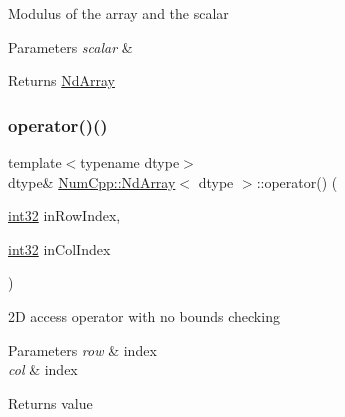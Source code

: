Modulus of the array and the scalar


\begin{DoxyParams}{Parameters}
{\em scalar} & \\
\hline
\end{DoxyParams}
\begin{DoxyReturn}{Returns}
\mbox{\hyperlink{class_num_cpp_1_1_nd_array}{Nd\+Array}} 
\end{DoxyReturn}
\mbox{\label{class_num_cpp_1_1_nd_array_a4986e1b7b9a46180f619523f80fcd288}} 
\subsubsection{\texorpdfstring{operator()()}{operator()()}\hspace{0.1cm}{\footnotesize\ttfamily [1/5]}}
{\footnotesize\ttfamily template$<$typename dtype$>$ \\
dtype\& \mbox{\hyperlink{class_num_cpp_1_1_nd_array}{Num\+Cpp\+::\+Nd\+Array}}$<$ dtype $>$\+::operator() (\begin{DoxyParamCaption}\item[{\mbox{\hyperlink{namespace_num_cpp_acf3eb1592f8b248ff0a236634864633c}{int32}}}]{in\+Row\+Index,  }\item[{\mbox{\hyperlink{namespace_num_cpp_acf3eb1592f8b248ff0a236634864633c}{int32}}}]{in\+Col\+Index }\end{DoxyParamCaption})\hspace{0.3cm}{\ttfamily [inline]}}

2D access operator with no bounds checking


\begin{DoxyParams}{Parameters}
{\em row} & index \\
\hline
{\em col} & index \\
\hline
\end{DoxyParams}
\begin{DoxyReturn}{Returns}
value 
\end{DoxyReturn}
\mbox{\label{class_num_cpp_1_1_nd_array_a5ff432872185f6f78036216c10c0394e}} 
